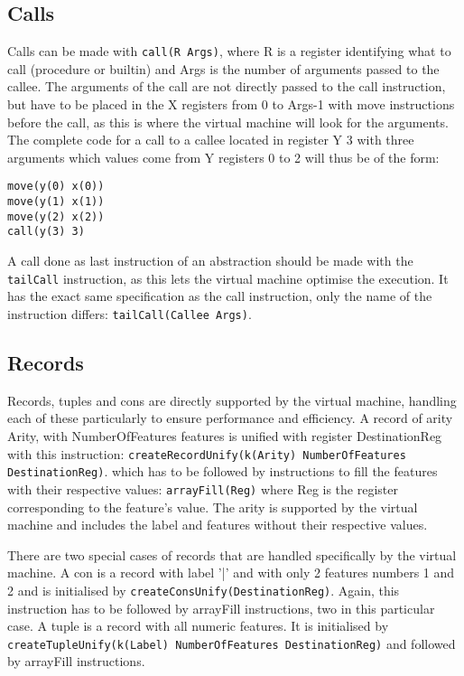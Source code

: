\documentclass[a4paper]{memoir}
\begin{document}
\subsection{Calls}\label{sec:opcode:calls}
Calls can be made with \lstinline!call(R Args)!, where R is a register identifying what to call (procedure or builtin) and Args is the number of arguments passed to the callee. The arguments of the call are not directly passed to the call instruction, but have to be placed in the X registers from 0 to Args-1 with move instructions before the call, as this is where the virtual machine will look for the arguments. The complete code for a call to a callee located in register Y 3 with three arguments which values come from Y registers 0 to 2 will thus be of the form:
\begin{lstlisting}
move(y(0) x(0))
move(y(1) x(1))
move(y(2) x(2))
call(y(3) 3)
\end{lstlisting}

A call done as last instruction of an abstraction should be made with the
\lstinline!tailCall! instruction, as this lets the virtual machine optimise the execution. It has the exact same specification as the call instruction, only the name of the instruction differs: \lstinline!tailCall(Callee Args)!.

\subsection{Records}\label{sec:opcode:records}
Records, tuples and cons are directly supported by the virtual machine, handling each of these particularly to ensure performance and efficiency.
A record of arity Arity, with NumberOfFeatures features is unified with register DestinationReg with this instruction:
\lstinline!createRecordUnify(k(Arity) NumberOfFeatures DestinationReg)!. which has to be followed by instructions to fill the features with their respective values:
\lstinline!arrayFill(Reg)! where Reg is the register corresponding to the feature's value.
The arity is supported by the virtual machine and includes the label and features without their respective values.

There are two special cases of records that are handled specifically by the virtual machine.
A con is a record with label '|' and with only 2 features numbers 1 and 2 and is initialised by
\lstinline!createConsUnify(DestinationReg)!. Again, this instruction has to be followed by arrayFill instructions, two in this particular case.
A tuple is a record with all numeric features. It is initialised by \lstinline!createTupleUnify(k(Label) NumberOfFeatures DestinationReg)! and followed by arrayFill instructions.
\end{document}
